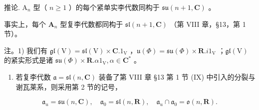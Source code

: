 推论. \(\mathrm{A}_n\) 型（ \(n \geq 1\) ）的每个紧单实李代数同构于 \(\mathfrak{su}(n + 1, \mathbf{C})\) 。

事实上，每个 \(\mathbf{A}_n\) 型复李代数都同构于 \(\mathfrak{sl}(n + 1,\mathbf{C})\) （第 VIII 章，§13，第 1 节）。

注。1) 我们有 \(\mathfrak{gl}(\mathrm{V}) = \mathfrak{sl}(\mathrm{V}) \times \mathbf{C}.1_{\mathrm{V}}\) ，\(\mathfrak{u}(\varPhi) = \mathfrak{su}(\varPhi) \times \mathbf{R}.i1_{\mathrm{V}}\) ；\(\mathfrak{gl}(\mathrm{V})\) 的紧实形式是诸 \(\mathfrak{su}(\varPhi) \times \mathbf{R}. \alpha 1_{\mathrm{V}}, \alpha \in \mathbf{C}^*\) 。

\begin{enumerate}
\def\labelenumi{\arabic{enumi})}
\setcounter{enumi}{1}
\tightlist
\item
  若复李代数 \(\mathfrak{a} = \mathfrak{sl}(n,\mathbf{C})\) 装备了第 VIII 章 §13 第 1 节 (IX) 中引入的分裂与谢瓦莱系，则采用第 2 节的记号，
\end{enumerate}

\[
\mathfrak {a} _ {u} = \mathfrak {s u} (n, \mathbf {C}), \quad \mathfrak {a} _ {0} = \mathfrak {s l} (n, \mathbf {R}), \quad \mathfrak {a} _ {u} \cap \mathfrak {a} _ {0} = \mathfrak {o} (n, \mathbf {R}).
\]

